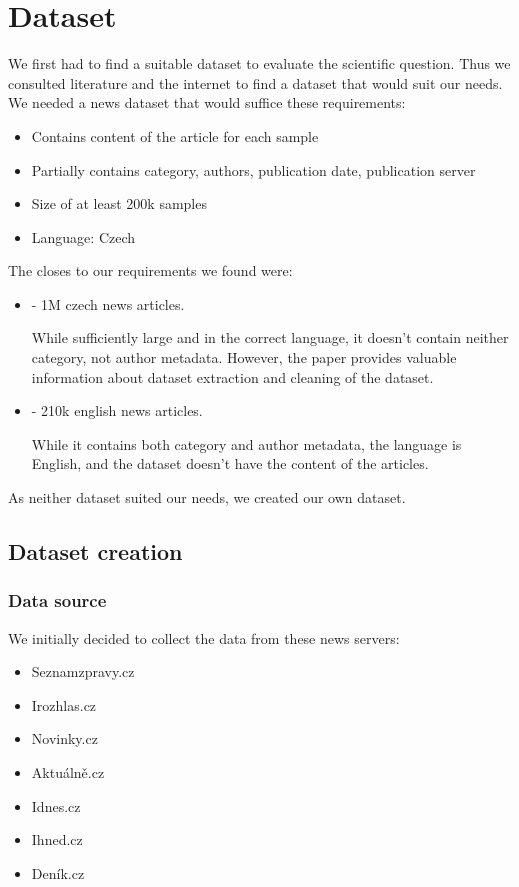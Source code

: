 \chapter{Dataset}
\label{chap:math}

We first had to find a suitable dataset to evaluate the scientific question.
Thus we consulted literature and the internet to find a dataset that would suit our needs.
We needed a news dataset that would suffice these requirements:

\begin{itemize}
    \item Contains content of the article for each sample
    \item Partially contains category, authors, publication date, publication server
    \item Size of at least 200k samples
    \item Language: Czech
\end{itemize}


The closes to our requirements we found were:
\begin{itemize}
    \item \cite{strakaSumeCzechLargeCzech2018a} - 1M czech news articles.

          While sufficiently large and in the correct language,
          it doesn't contain neither category, not author metadata.
          However, the paper provides valuable information about dataset extraction
          and cleaning of the dataset.
    \item \cite{misraNewsCategoryDataset2022} - 210k english news articles.

          While it contains both category and author metadata,
          the language is English, and the dataset doesn't have the content of the articles.
\end{itemize}

As neither dataset suited our needs, we created our own dataset.


\section{Dataset creation}
\label{sec:dataset-creation}

\subsection{Data source}
We initially decided to collect the data from these news servers:
\begin{itemize}
    \item Seznamzpravy.cz
    \item Irozhlas.cz
    \item Novinky.cz
    \item Aktuálně.cz
    \item Idnes.cz
    \item Ihned.cz
    \item Deník.cz
\end{itemize}

